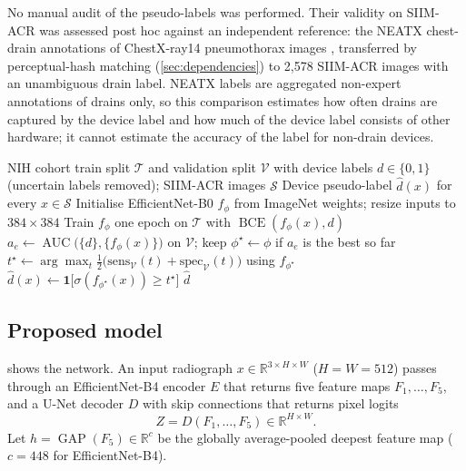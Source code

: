 \documentclass{ieeeaccess}
\DeclareMathOperator{\AUC}{AUC}
\DeclareMathOperator{\BCE}{BCE}
\DeclareMathOperator{\GAP}{GAP}
\begin{document}
No manual audit of the pseudo-labels was performed. Their validity on SIIM-ACR was assessed post hoc against an independent reference: the NEATX chest-drain annotations of ChestX-ray14 pneumothorax images \cite{jimenez2023shortcuts}, transferred by perceptual-hash matching (\cref{sec:dependencies}) to 2{,}578 SIIM-ACR images with an unambiguous drain label. NEATX labels are aggregated non-expert annotations of drains only, so this comparison estimates how often drains are captured by the device label and how much of the device label consists of other hardware; it cannot estimate the accuracy of the label for non-drain devices.

\begin{algorithm}[!t]
\caption{Device pseudo-labelling (stage \emph{planb\_prep})}
\label{alg:pseudo}
\begin{algorithmic}[1]
\Require NIH cohort train split $\mathcal{T}$ and validation split $\mathcal{V}$ with device labels $d\in\{0,1\}$ (uncertain labels removed); SIIM-ACR images $\mathcal{S}$
\Ensure Device pseudo-label $\hat d(x)$ for every $x\in\mathcal{S}$
\State Initialise EfficientNet-B0 $f_\phi$ from ImageNet weights; resize inputs to $384\times384$
  \State Train $f_\phi$ one epoch on $\mathcal{T}$ with $\BCE(f_\phi(x),d)$
  \State $a_e \gets \AUC\big(\{d\},\{f_\phi(x)\}\big)$ on $\mathcal{V}$; keep $\phi^\star \gets \phi$ if $a_e$ is the best so far \label{line:pseudo-select}
\EndFor
\State $t^\star \gets \arg\max_t \tfrac12\big(\mathrm{sens}_{\mathcal{V}}(t)+\mathrm{spec}_{\mathcal{V}}(t)\big)$ using $f_{\phi^\star}$ \label{line:pseudo-thr}
  \State $\hat d(x) \gets \mathbf{1}\big[\sigma(f_{\phi^\star}(x)) \ge t^\star\big]$
\EndFor
\State \Return $\hat d$ 
\end{algorithmic}
\end{algorithm}

\subsection{Proposed model}
\label{sec:model}
 shows the network. An input radiograph $x\in\mathbb{R}^{3\times H\times W}$ ($H=W=512$) passes through an EfficientNet-B4 encoder $E$ that returns five feature maps $F_1,\dots,F_5$, and a U-Net decoder $D$ \cite{ronneberger2015unet} with skip connections that returns pixel logits
\begin{equation}
Z = D(F_1,\dots,F_5)\in\mathbb{R}^{H\times W}.
\label{eq:seg}
\end{equation}
Let $h=\GAP(F_5)\in\mathbb{R}^{c}$ be the globally average-pooled deepest feature map ($c=448$ for EfficientNet-B4).
\end{document}
